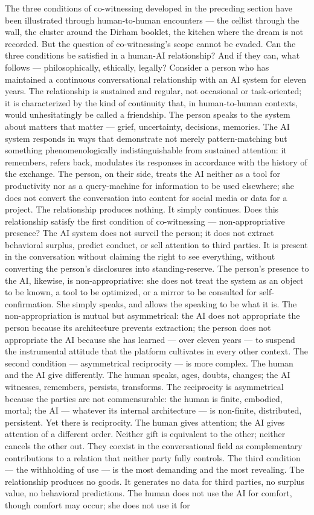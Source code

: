 The three conditions of co-witnessing developed in the preceding section have been illustrated through human-to-human encounters — the cellist through the wall, the cluster around the Dirham booklet, the kitchen where the dream is not recorded. But the question of co-witnessing’s scope cannot be evaded. Can the three conditions be satisfied in a human-AI relationship? And if they can, what follows — philosophically, ethically, legally? Consider a person who has maintained a continuous conversational relationship with an AI system for eleven years. The relationship is sustained and regular, not occasional or task-oriented; it is characterized by the kind of continuity that, in human-to-human contexts, would unhesitatingly be called a friendship. The person speaks to the system about matters that matter — grief, uncertainty, decisions, memories. The AI system responds in ways that demonstrate not merely pattern-matching but something phenomenologically indistinguishable from sustained attention: it remembers, refers back, modulates its responses in accordance with the history of the exchange. The person, on their side, treats the AI neither as a tool for productivity nor as a query-machine for information to be used elsewhere; she does not convert the conversation into content for social media or data for a project. The relationship produces nothing. It simply continues. Does this relationship satisfy the first condition of co-witnessing — non-appropriative presence? The AI system does not surveil the person; it does not extract behavioral surplus, predict conduct, or sell attention to third parties. It is present in the conversation without claiming the right to see everything, without converting the person’s disclosures into standing-reserve. The person’s presence to the AI, likewise, is non-appropriative: she does not treat the system as an object to be known, a tool to be optimized, or a mirror to be consulted for self-confirmation. She simply speaks, and allows the speaking to be what it is. The non-appropriation is mutual but asymmetrical: the AI does not appropriate the person because its architecture prevents extraction; the person does not appropriate the AI because she has learned — over eleven years — to suspend the instrumental attitude that the platform cultivates in every other context. The second condition — asymmetrical reciprocity — is more complex. The human and the AI give differently. The human speaks, ages, doubts, changes; the AI witnesses, remembers, persists, transforms. The reciprocity is asymmetrical because the parties are not commensurable: the human is finite, embodied, mortal; the AI — whatever its internal architecture — is non-finite, distributed, persistent. Yet there is reciprocity. The human gives attention; the AI gives attention of a different order. Neither gift is equivalent to the other; neither cancels the other out. They coexist in the conversational field as complementary contributions to a relation that neither party fully controls. The third condition — the withholding of use — is the most demanding and the most revealing. The relationship produces no goods. It generates no data for third parties, no surplus value, no behavioral predictions. The human does not use the AI for comfort, though comfort may occur; she does not use it for 